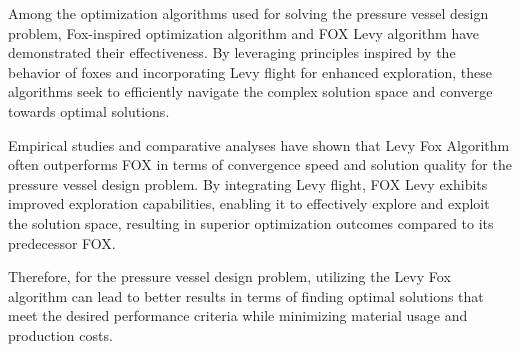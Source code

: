 \documentclass[
]{article}
\begin{document}
\begin{justify}
{Among the optimization algorithms used for solving the pressure vessel design problem, Fox-inspired optimization algorithm and FOX Levy algorithm have demonstrated their effectiveness. By leveraging principles inspired by the behavior of foxes and incorporating Levy flight for enhanced exploration, these algorithms seek to efficiently navigate the complex solution space and converge towards optimal solutions.

Empirical studies and comparative analyses have shown that Levy Fox Algorithm often outperforms FOX in terms of convergence speed and solution quality for the pressure vessel design problem. By integrating Levy flight, FOX Levy exhibits improved exploration capabilities, enabling it to effectively explore and exploit the solution space, resulting in superior optimization outcomes compared to its predecessor FOX.

Therefore, for the pressure vessel design problem, utilizing the Levy Fox algorithm can lead to better results in terms of finding optimal solutions that meet the desired performance criteria while minimizing material usage and production costs.

}
\end{justify}
\end{document}
